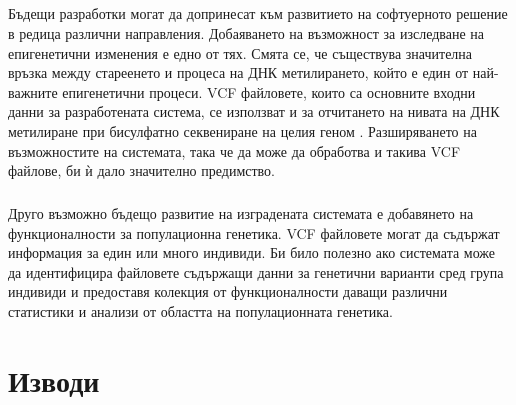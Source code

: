 \documentclass[pdftex,cyrillic,14pt,a4page,twoside,openright]{extreport}
\begin{document}
\paragraph{}
Бъдещи разработки могат да допринесат към развитието на софтуерното решение в редица различни направления. Добаяването на възможност за изследване на епигенетични изменения е едно от тях. Смята се, че съществува значителна връзка между стареенето и процеса на ДНК метилирането, който е един от най-важните епигенетични процеси. VCF файловете, които са основните входни данни за разработената система, се използват и за отчитането на нивата на ДНК метилиране при бисулфатно секвениране на целия геном \cite{barturen2013, merkel2018}. Разширяването на възможностите на системата, така че да може да обработва и такива VCF файлове, би ѝ дало значително предимство.

\paragraph{}
Друго възможно бъдещо развитие на изградената системата е добавянето на функционалности за популационна генетика. VCF файловете могат да съдържат информация за един или много индивиди. Би било полезно ако системата може да идентифицира файловете съдържащи данни за генетични варианти сред група индивиди и предоставя колекция от функционалности даващи различни статистики и анализи от областта на популационната генетика.

\chapter{Изводи}
\end{document}
